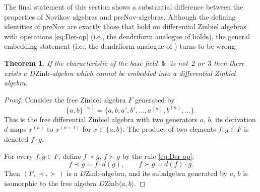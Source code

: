 \documentclass[pdftex]{sigma}
\numberwithin{equation}{section}
\newtheorem{Theorem}{Theorem}[section]
\def\Nov{\mathrm{Nov}}
\def\Zinb{\mathrm{Zinb}}
\def\pre{\mathrm{pre}}
\begin{document}
The final statement of this section shows a substantial difference
between the properties of Novikov algebras and $\pre\Nov $-algebras.
Although the defining identities of $\pre\Nov $
are exactly those that hold on differential Zinbiel algebras
with operations \eqref{eq:Der-op}
(i.e.,
the dendriform analogue of \cite[Theorem~7.8]{DzhLofwall2002}
holds),
the general embedding statement (i.e., the dendriform analogue
of \cite[Theorem~3]{BCZ-2017})
turns to be wrong.

\begin{Theorem}%
If the characteristic of the base field $\Bbbk $ is not~$2$ or~$3$
then there exists a $D\Zinb $-algebra which cannot be embedded into a differential Zinbiel algebra.
\end{Theorem}

\begin{proof}
Consider the free Zinbiel algebra $F$ generated
by
\[
\{a,b\}^{(\omega )} = \bigl\{a,b,a',b', \dots, a^{(n)}, b^{(n)}, \dots \bigr\}.
\]
This is the free differential Zinbiel algebra
with two
generators $a$, $b$, its derivation $d$ maps $x^{(n)}$ to $x^{(n+1)}$
for $x\in \{a,b\}$. The product of two elements $f,g\in F$ is denoted
$f\cdot g$.

For every $f,g\in F$, define $f\prec g$, $f\succ g$
by the rule \eqref{eq:Der-op}:
\[
f\prec g = f\cdot d(g),\qquad f\succ g = d(f)\cdot g.
\]
Then $(F,\prec, \succ )$ is a $D\Zinb $-algebra, and its
subalgebra generated by $a$, $b$ is isomorphic to the free algebra $D\Zinb \langle a,b\rangle $.


\end{proof}
\end{document}
